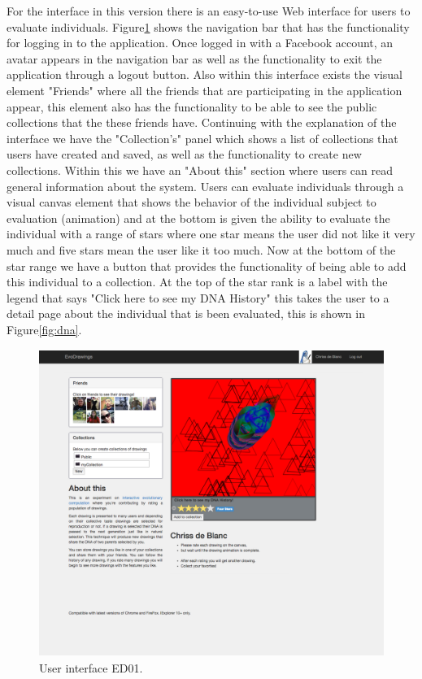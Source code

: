 For the interface in this version there is an easy-to-use Web interface for
users to evaluate  individuals. Figure\ref{fig:UI_01} shows the navigation
bar that has the functionality for logging in to the application.
Once logged in with a Facebook account, an avatar appears in the navigation bar
as well as the functionality to exit the application through a logout button. Also
within this interface exists the visual element "Friends" where all the friends
that are participating in the application appear, this element also has the
functionality to be able to see the public collections that the these friends have.
Continuing with the explanation of the interface we have the "Collection's" panel
which shows a list of collections that users have created and saved, as well as
the functionality to create new collections. Within this we have
an "About this" section where users can read general information about the
system. Users can evaluate individuals through a
visual canvas element that shows the behavior of the individual subject to
evaluation (animation) and at the bottom is given the ability to evaluate the
individual with a range of stars where one star means the user did not like it
very much and five stars mean the user like it too much. Now at the bottom of
the star range we have a button that provides the functionality of being able to
add this individual to a collection. At
the top of the star rank is a label with the legend that says "Click here to
see my DNA History" this takes the user to a detail page about the individual that is
been evaluated, this is shown
in Figure\ref{fig:dna}.

\begin{figure}
\captionsetup{justification=centering,margin=2cm}
\centering
\setlength\fboxsep{0pt}
\setlength\fboxrule{0.7pt}
\includegraphics[width=12cm,height=10cm,keepaspectratio]{img/UI_ed01.png}
\caption{User interface ED01.}
\label{fig:UI_01}
\end{figure}


